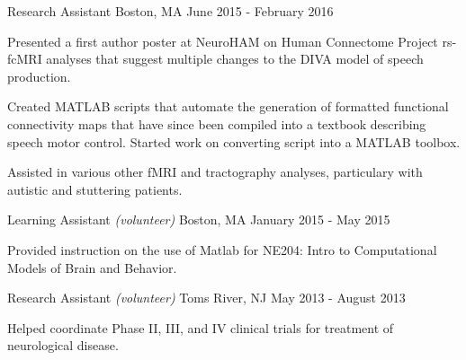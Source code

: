 \begin{cventries}
    {Research Assistant}
    {Boston, MA}
    {June 2015 - February 2016}
    {\begin{cvitems}
        \item{Presented a first author poster at NeuroHAM on Human Connectome Project rs-fcMRI analyses that suggest multiple changes to the DIVA model of speech production.\vspace*{0.1cm}}
        \item{Created MATLAB scripts that automate the generation of formatted functional connectivity maps that have since been compiled into a textbook describing speech motor control. Started work on converting script into a MATLAB toolbox.\vspace*{0.1cm}}
        \item{Assisted in various other fMRI and tractography analyses, particulary with autistic and stuttering patients.}
    \end{cvitems}}
    \vspace*{0.2cm}
    
    {Learning Assistant \textnormal{\small{\textit{(volunteer)}}}}
    {Boston, MA}
    {January 2015 - May 2015}
    {\begin{cvitems}
        \item{Provided instruction on the use of Matlab for NE204: Intro to Computational Models of Brain and Behavior.}
    \end{cvitems}}
    \vspace*{0.2cm}
    
    {Research Assistant \textnormal{\small{\textit{(volunteer)}}}}
    {Toms River, NJ}
    {May 2013 - August 2013}
    {\begin{cvitems}
        \item{Helped coordinate Phase II, III, and IV clinical trials for treatment of neurological disease.}
    \end{cvitems}}
    
\end{cventries}
